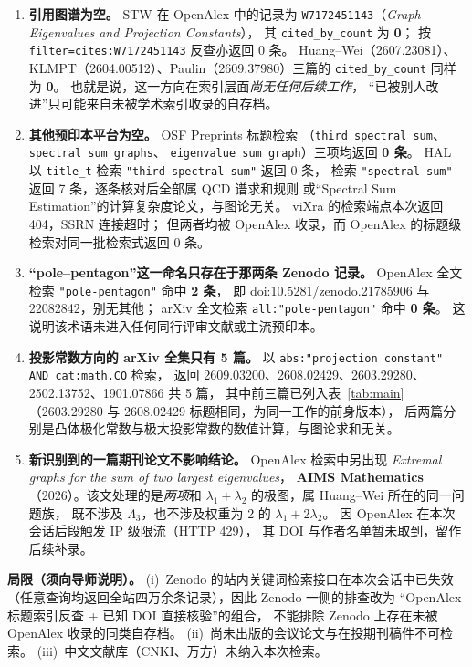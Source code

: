 \documentclass[UTF8,11pt]{ctexart}
\newcommand{\Lam}{\Lambda}
\begin{document}
\begin{enumerate}[label=(\alph*),leftmargin=2.2em]
\item \textbf{引用图谱为空。} STW 在 OpenAlex 中的记录为
\texttt{W7172451143}（\emph{Graph Eigenvalues and Projection Constants}），
其 \texttt{cited\_by\_count} 为 \textbf{0}；
按 \texttt{filter=cites:W7172451143} 反查亦返回 0 条。
Huang--Wei（2607.23081）、KLMPT（2604.00512）、Paulin（2609.37980）三篇的
\texttt{cited\_by\_count} 同样为 \textbf{0}。
也就是说，这一方向在索引层面\emph{尚无任何后续工作}，
``已被别人改进''只可能来自未被学术索引收录的自存档。

\item \textbf{其他预印本平台为空。} OSF Preprints 标题检索
（\texttt{third spectral sum}、\texttt{spectral sum graphs}、
\texttt{eigenvalue sum graph}）三项均返回 \textbf{0 条}。
HAL 以 \texttt{title\_t} 检索 \texttt{"third spectral sum"} 返回 0 条，
检索 \texttt{"spectral sum"} 返回 7 条，逐条核对后全部属 QCD 谱求和规则
或``Spectral Sum Estimation''的计算复杂度论文，与图论无关。
viXra 的检索端点本次返回 404，SSRN 连接超时；
但两者均被 OpenAlex 收录，而 OpenAlex 的标题级检索对同一批检索式返回 0 条。

\item \textbf{``pole--pentagon''这一命名只存在于那两条 Zenodo 记录。}
OpenAlex 全文检索 \texttt{"pole-pentagon"} 命中 \textbf{2 条}，
即 doi:10.5281/zenodo.21785906 与 22082842，别无其他；
arXiv 全文检索 \texttt{all:"pole-pentagon"} 命中 \textbf{0 条}。
这说明该术语未进入任何同行评审文献或主流预印本。

\item \textbf{投影常数方向的 arXiv 全集只有 5 篇。}
以 \texttt{abs:"projection constant" AND cat:math.CO} 检索，
返回 2609.03200、2608.02429、2603.29280、2502.13752、1901.07866 共 5 篇，
其中前三篇已列入表~\ref{tab:main}
（2603.29280 与 2608.02429 标题相同，为同一工作的前身版本），
后两篇分别是凸体极化常数与极大投影常数的数值计算，与图论求和无关。

\item \textbf{新识别到的一篇期刊论文不影响结论。}
OpenAlex 检索中另出现
\emph{Extremal graphs for the sum of two largest eigenvalues}，
\textbf{AIMS Mathematics}（2026）。该文处理的是\emph{两项}和
$\lambda_1+\lambda_2$ 的极图，属 Huang--Wei 所在的同一问题族，
既不涉及 $\Lam_3$，也不涉及权重为 2 的 $\lambda_1+2\lambda_2$。
因 OpenAlex 在本次会话后段触发 IP 级限流（HTTP 429），
其 DOI 与作者名单暂未取到，留作后续补录。
\end{enumerate}

\textbf{局限（须向导师说明）。}
(i)~Zenodo 的站内关键词检索接口在本次会话中已失效
（任意查询均返回全站四万余条记录），因此 Zenodo 一侧的排查改为
``OpenAlex 标题索引反查 + 已知 DOI 直接核验''的组合，
不能排除 Zenodo 上存在未被 OpenAlex 收录的同类自存档。
(ii)~尚未出版的会议论文与在投期刊稿件不可检索。
(iii)~中文文献库（CNKI、万方）未纳入本次检索。
\end{document}
